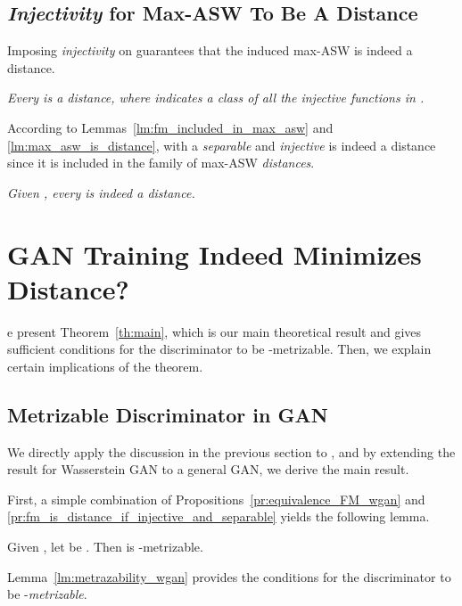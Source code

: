 \subsection{\textit{Injectivity} for Max-ASW To Be A Distance}
\label{ssec:injectivity}

Imposing \textit{injectivity} on  guarantees that the induced max-ASW is indeed a distance.
\begin{lemma}
\textit{
Every  is a distance, where  indicates a class of all the injective functions in .
} \label{lm:max_asw_is_distance}
\end{lemma}
According to Lemmas~\ref{lm:fm_included_in_max_asw} and \ref{lm:max_asw_is_distance},  with a \textit{separable} and \textit{injective}  is indeed a distance since it is included in the family of max-ASW \textit{distances}.
\begin{proposition}
\textit{
Given , every  is indeed a distance.
} \label{pr:fm_is_distance_if_injective_and_separable}
\end{proposition}


\section{GAN Training Indeed Minimizes Distance?}
\label{sec:main_theorem}

e present Theorem~\ref{th:main}, which is our main theoretical result and gives sufficient conditions for the discriminator to be -metrizable. Then, we explain certain implications of the theorem.
\subsection{Metrizable Discriminator in GAN}
\label{ssec:metrizable_discriminator}
We directly apply the discussion in the previous section to , and by extending the result for Wasserstein GAN to a general GAN, we derive the main result.


First, a simple combination of Propositions~\ref{pr:equivalence_FM_wgan} and \ref{pr:fm_is_distance_if_injective_and_separable} yields the following lemma.

\begin{lemma}[-metrizable]
Given  , let  be . Then  is -metrizable. \label{lm:metrazability_wgan}
\end{lemma}
Lemma~\ref{lm:metrazability_wgan} provides the conditions for the discriminator to be -\textit{metrizable}.  

